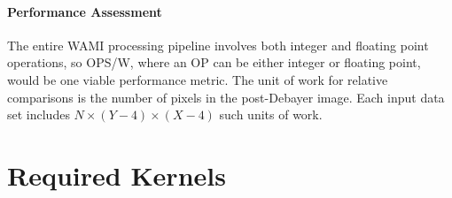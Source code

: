 \documentclass{report}
\begin{document}
\subsubsection{Performance Assessment}

The entire WAMI processing pipeline involves both integer and floating point
operations, so OPS/W, where an OP can be either integer or floating point,
would be one viable performance metric.
The unit of work for relative comparisons is the number of pixels in the
post-Debayer image.
Each input data set includes $N \times (Y-4) \times (X-4)$ such units of work.


\chapter{Required Kernels}








\end{document}

